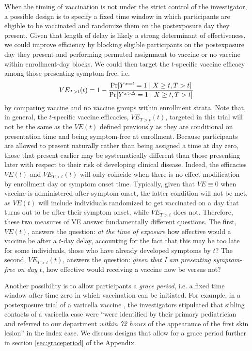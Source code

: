 \documentclass[11pt]{article}
\begin{document}
When the timing of vaccination is not under the strict control of the investigator, a possible design is to specify a fixed time window in which participants are eligible to be vaccinated and randomize them on the postexposure day they present. Given that length of delay is likely a strong determinant of effectiveness, we could improve efficiency by blocking eligible participants on the postexposure day they present and performing permuted assignment to vaccine or no vaccine within enrollment-day blocks. We could then target the $t$-specific vaccine efficacy among those presenting symptom-free, i.e.
$$
VE_{T > t}(t) = 1 - \frac{\Pr[Y^{x = t} = 1 \mid X \geq t, T > t]}{\Pr[Y^{x > \Delta} = 1 \mid X \geq t, T > t]} \\
$$
by comparing vaccine and no vaccine groups within enrollment  strata. Note that, in general, the $t$-specific vaccine efficacies, $VE_{T > t}(t)$, targeted in this trial will not be the same as the $VE(t)$ defined previously as they are conditional on presentation time and being symptom-free at enrollment. Because participants are allowed to present naturally rather than being assigned a time at day zero, those that present earlier may be systematically different than those presenting later with respect to their risk of developing clinical disease. Indeed, the efficacies $VE(t)$ and $VE_{T > t}(t)$ will only coincide when there is no effect modification by enrollment day or symptom onset time. Typically, given that $VE \equiv 0$ when vaccine is administered after symptom onset, the latter condition will not be met, as $VE(t)$ will include individuals randomized to get vaccinated on a day that turns out to be after their symptom onset, while $VE_{T > t}$ does not.  Therefore, these two measures of VE answer fundamentally different questions. The first, $VE(t)$, answers the question: \textit{at the time of exposure} how effective would a vaccine be after a $t$-day delay, accounting for the fact that this may be too late for some individuals, those who have already developed symptoms by $t$? The second, $VE_{T > t}(t)$, answers the question: \textit{given that I am presenting symptom-free on day $t$}, how effective would receiving a vaccine now be versus not? 

Another possibility is to allow participants a \textit{grace period}\cite{smith_emulation_2022}, i.e. a fixed time window after time zero in which vaccination can be initiated. For example, in a postexposure trial of a varicella vaccine \cite{mor_efficacy_2004}, the investigators stipulated that sibling contacts of a varicella case were ``were identified by their primary pediatrician and referred to our department \textit{within 72 hours} of the appearance of the first skin lesion'' in the index case. We discuss designs that allow for a grace period further in section \ref{sec:graceperiod} of the Appendix.
\end{document}
